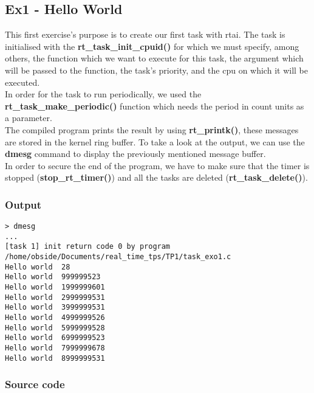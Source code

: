 \subsection{Ex1 - Hello World}
This first exercise's purpose is to create our first task with rtai. The task is initialised with the \textbf{rt\_task\_init\_cpuid()} for which we must specify, among others, the function which we want to execute for this task, the argument which will be passed to the function, the task's priority, and the cpu on which it will be executed.\\

In order for the task to run periodically, we used the \textbf{rt\_task\_make\_periodic()} function which needs the period in count units as a parameter. \\

The compiled program prints the result by using \textbf{rt\_printk()}, these messages are stored in the kernel ring buffer. To take a look at the output, we can use the \textbf{dmesg} command to display the previously mentioned message buffer. \\

In order to secure the end of the program, we have to make sure that the timer is stopped (\textbf{stop\_rt\_timer()}) and all the tasks are deleted (\textbf{rt\_task\_delete()}).

\subsubsection{Output}
\begin{lstlisting}[keywordstyle=\color{black}]
> dmesg
...
[task 1] init return code 0 by program /home/obside/Documents/real_time_tps/TP1/task_exo1.c
Hello world  28
Hello world  999999523
Hello world  1999999601
Hello world  2999999531
Hello world  3999999531
Hello world  4999999526
Hello world  5999999528
Hello world  6999999523
Hello world  7999999678
Hello world  8999999531
\end{lstlisting}

\subsubsection{Source code}

